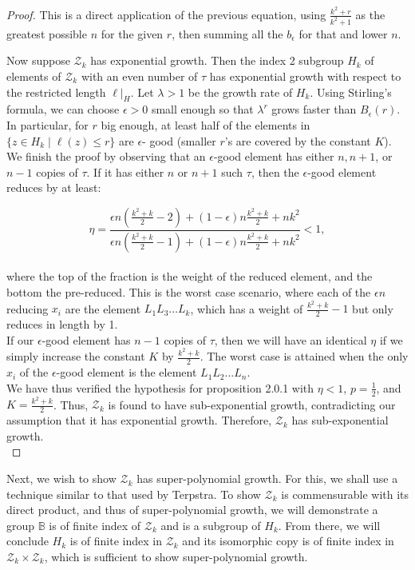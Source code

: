 \documentclass[11pt]{amsart}
\theoremstyle{definition}
\theoremstyle{remark}
\numberwithin{equation}{section}
\begin{document}
\begin{proof}
\indent This is a direct application of the previous equation, using $\frac{k^2+r}{k^2+1}$ as the greatest possible $n$ for the given $r$, then summing all the $b_\epsilon$ for that and lower $n$.

\indent Now suppose $\mathcal{Z}_k$ has exponential growth. Then the index 2 subgroup $H_k$ of elements of $\mathcal{Z}_k$ with an even number of $\tau$ has exponential growth with respect to the restricted length $\ell|_H$. Let $\lambda>1$ be the growth rate of $H_k$. Using Stirling's formula, we can choose $\epsilon>0$ small enough so that $\lambda^{r}$ grows faster than $B_\epsilon(r)$. In particular, for $r$ big enough, at least half of the elements in $\{z\in H_k \mid \ell(z)\leq r\}$ are $\epsilon$-
good (smaller $r$'s are covered by the constant $K$).\\
\indent We finish the proof by observing that an $\epsilon$-good element has either $n,n+1$, or $n-1$ copies of $\tau$. If it has either $n$ or $n+1$ such $\tau$, then the $\epsilon$-good element reduces by at least:

$$\eta=\frac{\epsilon n(\frac{k^2+k}{2}-2)+(1-\epsilon)n\frac{k^2+k}{2}+nk^2    }{\epsilon n(\frac{k^2+k}{2}-1)+(1-\epsilon)n\frac{k^2+k}{2}+nk^2    }<1,$$\\

where the top of the fraction is the weight of the reduced element, and the bottom the pre-reduced. This is the worst case scenario, where each of the $\epsilon n$ reducing $x_i$ are the element $L_1L_3\ldots L_k$, which has a weight of $\frac{k^2+k}{2}-1$ but only reduces in length by 1.\\
\indent If our $\epsilon$-good element has $n-1$ copies of $\tau$, then we will have an identical $\eta$ if we simply increase the constant $K$ by $\frac{k^2+k}{2}$. The worst case is attained when the only $x_i$ of the $\epsilon$-good element is the element $L_1L_2...L_n$.\\
\indent We have thus verified the hypothesis for proposition 2.0.1 with $\eta<1$, $p=\frac{1}{2}$, and $K=\frac{k^2+k}{2 }$. Thus, $\mathcal{Z}_k$ is found to have sub-exponential growth, contradicting our assumption that it has exponential growth. Therefore, $\mathcal{Z}_k$ has sub-exponential growth.\\
\end{proof}

\indent Next, we wish to show $\mathcal{Z}_k$ has super-polynomial growth. For this, we shall use a technique similar to that used by Terpstra. To show $\mathcal{Z}_k$ is commensurable with its direct product, and thus of super-polynomial growth, we will demonstrate a group $\mathbb{B}$ \space is of finite index of $\mathcal{Z}_k$ and is a subgroup of $H_k$. From there, we will conclude $H_k$ is of finite index in $\mathcal{Z}_k$ and its isomorphic copy is of finite index in $\mathcal{Z}_k\times \mathcal{Z}_k$, which is sufficient to show super-polynomial growth.\\
\end{document}
